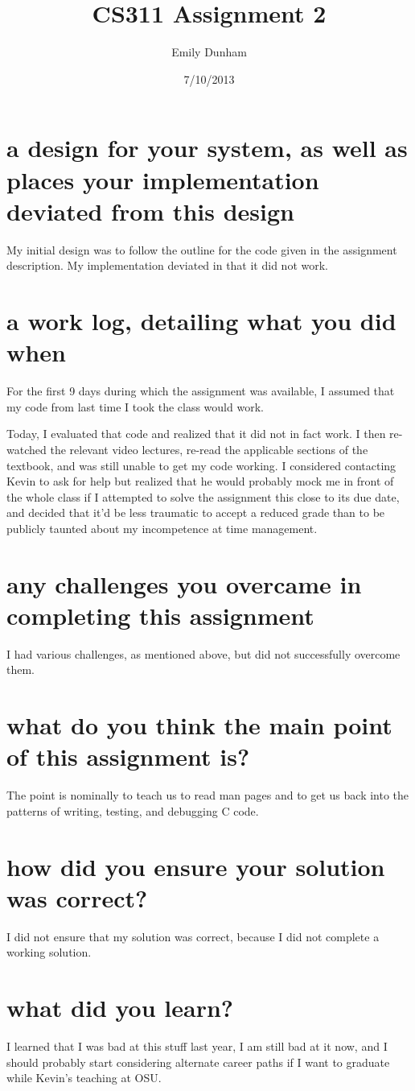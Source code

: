 \documentclass[10pt]{article}
\title{CS311 Assignment 2}
\author{Emily Dunham}
\date{7/10/2013}
\begin{document}
\maketitle

\section{a design for your system, as well as places your implementation deviated from this design}

My initial design was to follow the outline for the code given in the
assignment description. My implementation deviated in that it did not work.

\section{a work log, detailing what you did when}

For the first 9 days during which the assignment was available, I assumed that
my code from last time I took the class would work. 

Today, I evaluated that code and realized that it did not in fact work. I then
re-watched the relevant video lectures, re-read the applicable sections of the
textbook, and was still unable to get my code working. I considered contacting
Kevin to ask for help but realized that he would probably mock me in front of
the whole class if I attempted to solve the assignment this close to its due
date, and decided that it'd be less traumatic to accept a reduced grade than
to be publicly taunted about my incompetence at time management. 

\section{any challenges you overcame in completing this assignment}

I had various challenges, as mentioned above, but did not successfully
overcome them.

\section{what do you think the main point of this assignment is?}

The point is nominally to teach us to read man pages and to get us back into
the patterns of writing, testing, and debugging C code. 

\section{how did you ensure your solution was correct?}

I did not ensure that my solution was correct, because I did not complete a
working solution.

\section{what did you learn?}

I learned that I was bad at this stuff last year, I am still bad at it now,
and I should probably start considering alternate career paths if I want to
graduate while Kevin's teaching at OSU.
\end{document}
